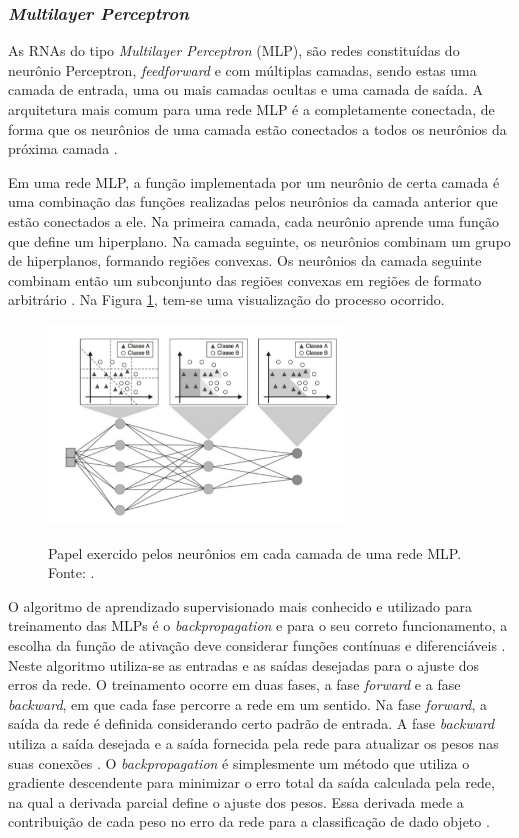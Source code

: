 \subsubsection{\emph{Multilayer Perceptron}}
\label{subsubsec:mlp}

As RNAs do tipo \emph{Multilayer Perceptron} (MLP), são redes constituídas do neurônio Perceptron, \emph{feedforward} e com múltiplas camadas, sendo estas uma camada de entrada, uma ou mais camadas ocultas e uma camada de saída. A arquitetura mais comum para uma rede MLP é a completamente conectada, de forma que os neurônios de uma camada estão conectados a todos os neurônios da próxima camada \cite{faceli}.

Em uma rede MLP, a função implementada por um neurônio de certa camada é uma combinação das funções realizadas pelos neurônios da camada anterior que estão conectados a ele. Na primeira camada, cada neurônio aprende uma função que define um hiperplano. Na camada seguinte, os neurônios combinam um grupo de hiperplanos, formando regiões convexas. Os neurônios da camada seguinte combinam então um subconjunto das regiões convexas em regiões de formato arbitrário \cite{faceli}. Na Figura \ref{fig:aprendizado-mlp}, tem-se uma visualização do processo ocorrido.


\begin{figure}[h!]
\centering
\caption{Papel exercido pelos neurônios em cada camada de uma rede MLP. Fonte: \cite{faceli}.}
\includegraphics[width=0.7\textwidth]{imgs/aprendizado-mlp}
\label{fig:aprendizado-mlp}
\end{figure}

O algoritmo de aprendizado supervisionado mais conhecido e utilizado para treinamento das MLPs é o \emph{backpropagation} e para o seu correto funcionamento, a escolha da função de ativação deve considerar funções contínuas e diferenciáveis  \cite{haykin}. Neste algoritmo utiliza-se as entradas e as saídas desejadas para o ajuste dos erros da rede. O treinamento ocorre em duas fases, a fase \emph{forward} e a fase \emph{backward}, em que cada fase percorre a rede em um sentido. Na fase \emph{forward}, a saída da rede é definida considerando certo padrão de entrada. A fase \emph{backward} utiliza a saída desejada e a saída fornecida pela rede para atualizar os pesos nas suas conexões \cite{braga}. O \emph{backpropagation} é simplesmente um método que utiliza o gradiente descendente para minimizar o erro total da saída calculada pela rede, na qual a derivada parcial define o ajuste dos pesos. Essa derivada mede a contribuição de cada peso no erro da rede para a classificação de dado objeto \cite{fausett, faceli}.

